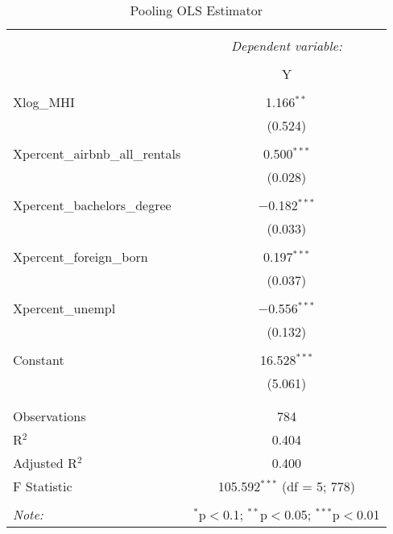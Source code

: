 \documentclass{article}
\begin{document}
\begin{table}[!htbp] \centering 
  \caption{Pooling OLS Estimator} 
  \label{} 
\begin{tabular}{@{\extracolsep{5pt}}lc} 
\\[-1.8ex]\hline 
\hline \\[-1.8ex] 
 & \multicolumn{1}{c}{\textit{Dependent variable:}} \\ 
\cline{2-2} 
\\[-1.8ex] & Y \\ 
\hline \\[-1.8ex] 
 Xlog\_MHI & 1.166$^{**}$ \\ 
  & (0.524) \\ 
  & \\ 
 Xpercent\_airbnb\_all\_rentals & 0.500$^{***}$ \\ 
  & (0.028) \\ 
  & \\ 
 Xpercent\_bachelors\_degree & $-$0.182$^{***}$ \\ 
  & (0.033) \\ 
  & \\ 
 Xpercent\_foreign\_born & 0.197$^{***}$ \\ 
  & (0.037) \\ 
  & \\ 
 Xpercent\_unempl & $-$0.556$^{***}$ \\ 
  & (0.132) \\ 
  & \\ 
 Constant & 16.528$^{***}$ \\ 
  & (5.061) \\ 
  & \\ 
\hline \\[-1.8ex] 
Observations & 784 \\ 
R$^{2}$ & 0.404 \\ 
Adjusted R$^{2}$ & 0.400 \\ 
F Statistic & 105.592$^{***}$ (df = 5; 778) \\ 
\hline 
\hline \\[-1.8ex] 
\textit{Note:}  & \multicolumn{1}{r}{$^{*}$p$<$0.1; $^{**}$p$<$0.05; $^{***}$p$<$0.01} \\ 
\end{tabular} 
\end{table} 
\end{document}
